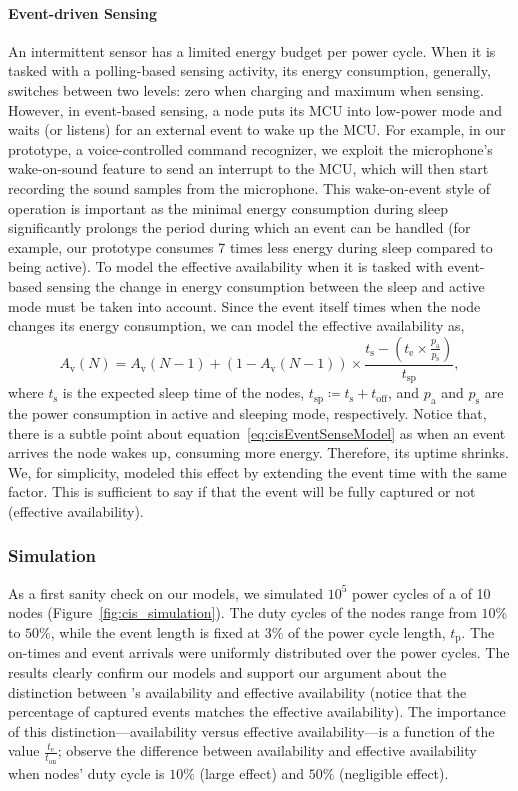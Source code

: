 \paragraph{Event-driven Sensing}
An intermittent sensor has a limited energy budget per power cycle. When it is tasked with a polling-based sensing activity, its energy consumption, generally, switches between two levels: zero when charging and maximum when sensing. However, in event-based sensing, a node puts its MCU into low-power mode and waits (or listens) for an external event to wake up the MCU. For example, in our prototype, a voice-controlled command recognizer, we exploit the microphone's wake-on-sound feature to send an interrupt to the MCU, which will then start recording the sound samples from the microphone. 
This wake-on-event style of operation is important as the minimal energy consumption during sleep significantly prolongs the period during which an event can be handled (for example, our prototype consumes 7 times less energy during sleep compared to being active).
To model the effective \cis availability when it is tasked with event-based sensing the change in energy consumption between the sleep and active mode must be taken into account. Since the event itself times when the node changes its energy consumption, we can model the effective availability as,
\begin{equation}
		A_\text{v}(N) = A_\text{v}(N-1) + \left(1-A_\text{v}(N-1)\right) \times \frac{t_\text{s} - (t_\text{e} \times\frac{p_\text{a}}{p_\text{s}}) }{t_\text{sp}},
		\label{eq:cisEventSenseModel}
\end{equation}
%
where $t_\text{s}$ is the expected sleep time of the \cis nodes, 
 $t_\text{sp} \coloneqq t_\text{s} + t_\text{off}$, 
 and $p_\text{a}$ and $p_\text{s}$ are the power consumption in active and sleeping mode, respectively.
 Notice that, there is a subtle point about equation~\ref{eq:cisEventSenseModel} as when an event arrives the node wakes up, consuming more energy. Therefore, its uptime shrinks. We, for simplicity, modeled this effect by extending the event time with the same factor. This is sufficient to say if that the event will be fully captured or not (effective availability).
%
\subsubsection{Simulation}
As a first sanity check on our models, we simulated $10^5$ power cycles of a \cis of 10 nodes (Figure~\ref{fig:cis_simulation}). The duty cycles of the nodes range from $10\%$ to $50\%$, while the event length is fixed at $3\%$ of the power cycle length, $t_\text{p}$. The on-times and event arrivals were uniformly distributed over the power cycles. 
The results clearly confirm our models and support our argument about the distinction between \cis's availability and effective availability (notice that the percentage of captured events matches the effective availability). 
The importance of this distinction---availability versus effective availability---is a function of the value $\frac{t_\text{e}}{t_\text{on}}$; observe the difference between availability and effective availability when nodes' duty cycle is $10\%$ (large effect) and $50\%$ (negligible effect).
%
%
